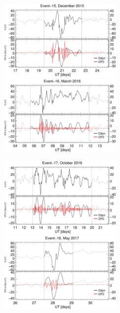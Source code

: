 \documentclass[a4paper,fleqn]{cas-dc}
\begin{document}
\begin{figure}[h!]
     \centerline{\Large \bf   
      \hspace{0.275\textwidth}  \color{black}{}
       \hspace{0.295\textwidth}  \color{black}{}
         \hfill}
      \includegraphics[width=6.0cm]{images/diono/iono_PI_V1_2015-12-17.eps}     
      \includegraphics[width=6.0cm]{images/diono/iono_PI_V1_2016-03-04.eps}
       \centerline{\Large \bf   
      \hspace{0.275\textwidth}  \color{black}{}
       \hspace{0.295\textwidth}  \color{black}{}
         \hfill}
       \includegraphics[width=6.0cm]{images/diono/iono_PI_V1_2016-10-11.eps}     
       \includegraphics[width=6.0cm]{images/diono/iono_PI_V1_2017-05-26.eps}


\end{figure}
\end{document}
